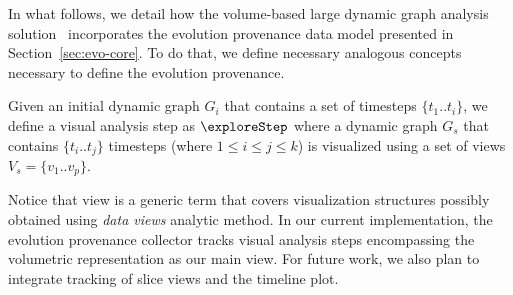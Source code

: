 {\color{Fuchsia}In what follows, we detail how the volume-based large dynamic graph analysis solution~\cite{Bruder2019} incorporates the evolution provenance data model presented in Section~\ref{sec:evo-core}. To do that, we define necessary analogous concepts necessary to define the evolution provenance.}


\begin{definition} 
Given an initial dynamic graph $G_i$ that contains a set of timesteps $\{t_1..t_i\}$, we define a visual analysis step as $\exploreStep$ where a dynamic graph $G_s$  that contains $\{t_i..t_j\}$ timesteps  (where $1 \leq i \leq j \leq k $) is visualized using a set of views $V_s=\{v_1..v_p\}$.
\end{definition}


Notice that view is a generic term that covers visualization structures possibly obtained using \emph{data views} analytic method.
In our current implementation, the evolution provenance collector tracks visual analysis steps encompassing the volumetric representation as our main view.
For future work, we also plan to integrate tracking of slice views and the timeline plot.




